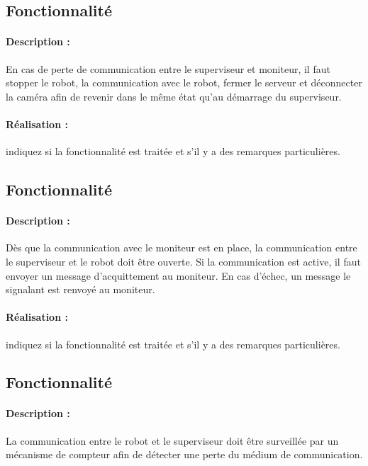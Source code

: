 \documentclass[11pt, a4paper]{paper}
\newcounter{cptreq}
\begin{document}
\subsection{Fonctionnalité \thecptreq}

\paragraph{Description :} En cas de perte de communication entre le superviseur et moniteur, il faut stopper le robot,  la communication avec le robot, fermer le serveur et déconnecter la caméra afin de revenir dans le même état qu'au démarrage du superviseur.

\paragraph{\color{black}Réalisation :}  {\color{red} indiquez si la fonctionnalité est traitée et s'il y a des remarques particulières.}
{\color{gray}
\subsection{Fonctionnalité \thecptreq *}

\paragraph{Description :} Dès que la communication avec le moniteur est en place, la communication entre le superviseur et le robot doit être ouverte. Si la communication est active, il faut envoyer un message d'acquittement au moniteur. En cas d'échec, un message le signalant est renvoyé au moniteur.

\paragraph{\color{black}Réalisation :}  {\color{red} indiquez si la fonctionnalité est traitée et s'il y a des remarques particulières.}
}
\subsection{Fonctionnalité \thecptreq}

\paragraph{Description :} La communication entre le robot et le superviseur doit être surveillée par un mécanisme de compteur afin de détecter une perte du médium de communication.
\end{document}
